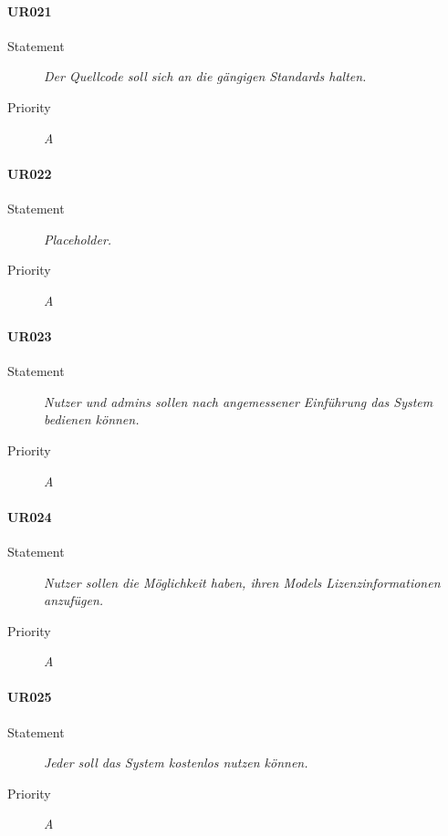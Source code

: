 \paragraph{UR021}
\begin{description}
\item[Statement] \textit{Der Quellcode soll sich an die gängigen Standards halten.}
\item[Priority] \textit{A}
\end{description}

\paragraph{UR022}
\begin{description}
\item[Statement] \textit{Placeholder.}
\item[Priority] \textit{A}
\end{description}

\paragraph{UR023}
\begin{description}
\item[Statement] \textit{Nutzer und \glspl{admin} sollen nach angemessener Einführung das System bedienen können.}
\item[Priority] \textit{A}
\end{description}

\paragraph{UR024}
\begin{description}
\item[Statement] \textit{Nutzer sollen die Möglichkeit haben, ihren \glspl{Model} Lizenzinformationen anzufügen.}
  \item[Priority]
    \textit{A}
\end{description}

\paragraph{UR025}
\begin{description}
\item[Statement] \textit{Jeder soll das System kostenlos nutzen können.}
\item[Priority] \textit{A}
\end{description}

